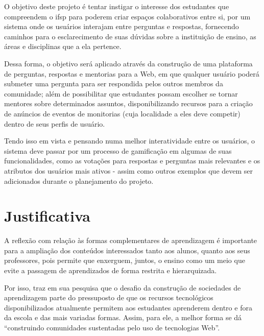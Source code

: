 O objetivo deste projeto é tentar instigar o interesse dos estudantes que compreendem o \acs{ifsp} para poderem criar espaços colaborativos entre si, por um sistema onde os usuários interajam entre perguntas e respostas, fornecendo caminhos para o esclarecimento de suas dúvidas sobre a instituição de ensino, as áreas e disciplinas que a ela pertence.  

Dessa forma, o objetivo será aplicado através da construção de uma plataforma de perguntas, respostas e mentorias para a Web, em que qualquer usuário poderá submeter uma pergunta para ser respondida pelos outros membros da comunidade; além de possibilitar que estudantes possam escolher se tornar mentores sobre determinados assuntos, disponibilizando recursos para a criação de anúncios de eventos de monitorias (cuja localidade a eles deve competir) dentro de seus perfis de usuário. 

Tendo isso em vista e pensando numa melhor interatividade entre os usuários, o sistema deve passar por um processo de \gls{gamificação} em algumas de suas funcionalidades, como as votações para respostas e perguntas mais relevantes e os atributos dos usuários mais ativos  - assim como outros exemplos que devem ser adicionados durante o planejamento do projeto.




\section{Justificativa}
A reflexão com relação às formas complementares de aprendizagem é importante para a ampliação dos conteúdos interessados tanto aos alunos, quanto aos seus professores, pois permite que enxerguem, juntos, o ensino como um meio que evite a passagem de aprendizados de forma restrita e hierarquizada.

Por isso,  traz em sua pesquisa que o desafio da construção de sociedades de aprendizagem parte do pressuposto de que os recursos tecnológicos disponibilizados atualmente permitem aos estudantes aprenderem dentro e fora da escola e das mais variadas formas. Assim, para ele, a melhor forma se dá “construindo comunidades sustentadas pelo uso de tecnologias Web”.

